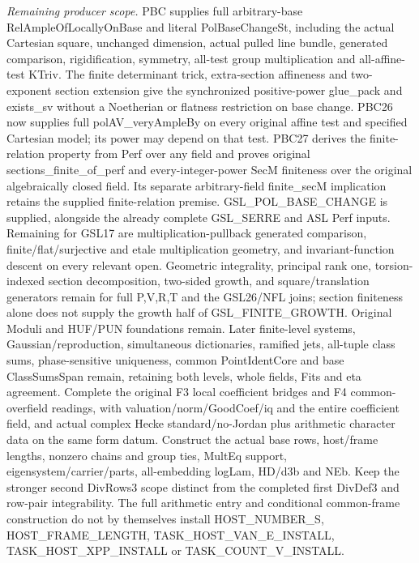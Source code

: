 \emph{Remaining producer scope.} PBC supplies full arbitrary-base RelAmpleOfLocallyOnBase and literal PolBaseChangeSt, including the actual Cartesian square, unchanged dimension, actual pulled line bundle, generated comparison, rigidification, symmetry, all-test group multiplication and all-affine-test KTriv. The finite determinant trick, extra-section affineness and two-exponent section extension give the synchronized positive-power glue\_\allowbreak pack and exists\_\allowbreak sv without a Noetherian or flatness restriction on base change. PBC26 now supplies full polAV\_\allowbreak veryAmpleBy on every original affine test and specified Cartesian model; its power may depend on that test. PBC27 derives the finite-relation property from Perf over any field and proves original sections\_\allowbreak finite\_\allowbreak of\_\allowbreak perf and every-integer-power SecM finiteness over the original algebraically closed field. Its separate arbitrary-field finite\_\allowbreak secM implication retains the supplied finite-relation premise. GSL\_\allowbreak POL\_\allowbreak BASE\_\allowbreak CHANGE is supplied, alongside the already complete GSL\_\allowbreak SERRE and ASL Perf inputs. Remaining for GSL17 are multiplication-pullback generated comparison, finite/flat/surjective and etale multiplication geometry, and invariant-function descent on every relevant open. Geometric integrality, principal rank one, torsion-indexed section decomposition, two-sided growth, and square/translation generators remain for full P,V,R,T and the GSL26/NFL joins; section finiteness alone does not supply the growth half of GSL\_\allowbreak FINITE\_\allowbreak GROWTH. Original Moduli and HUF/PUN foundations remain. Later finite-level systems, Gaussian/reproduction, simultaneous dictionaries, ramified jets, all-tuple class sums, phase-sensitive uniqueness, common PointIdentCore and base ClassSumsSpan remain, retaining both levels, whole fields, Fits and eta agreement. Complete the original F3 local coefficient bridges and F4 common-overfield readings, with valuation/norm/GoodCoef/iq and the entire coefficient field, and actual complex Hecke standard/no-Jordan plus arithmetic character data on the same form datum. Construct the actual base rows, host/frame lengths, nonzero chains and group ties, MultEq support, eigensystem/carrier/parts, all-embedding logLam, HD/d3b and NEb. Keep the stronger second DivRows3 scope distinct from the completed first DivDef3 and row-pair integrability. The full arithmetic entry and conditional common-frame construction do not by themselves install HOST\_\allowbreak NUMBER\_\allowbreak S, HOST\_\allowbreak FRAME\_\allowbreak LENGTH, TASK\_\allowbreak HOST\_\allowbreak VAN\_\allowbreak E\_\allowbreak INSTALL, TASK\_\allowbreak HOST\_\allowbreak XPP\_\allowbreak INSTALL or TASK\_\allowbreak COUNT\_\allowbreak V\_\allowbreak INSTALL.



